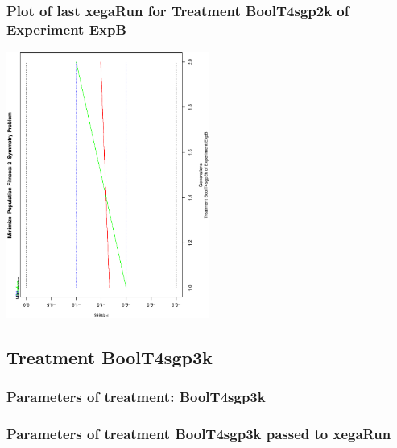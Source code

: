 \documentclass[18pt,c]{beamer}
\makeatletter
\def\beamer@writeslidentry@miniframesoff{%
  \expandafter\beamer@ifempty\expandafter{\beamer@framestartpage}{}%
  {%
   \clearpage\beamer@notesactions%
  }
}
\newcommand*{\miniframesoff}{\let\beamer@writeslidentry=\beamer@writeslidentry@miniframesoff}
\makeatother
\begin{document}
 \begin{frame}
 \frametitle{ Plot of last xegaRun for Treatment BoolT4sgp2k of Experiment ExpB }
 \begin{center}
\includegraphics[width=0.5\textwidth, angle=-90]
{ExpBPlotPopStatsFigure020.eps}
 \end{center}
 \label{report/ExpBPlotPopStatsFigure020.eps}  
 \end{frame}

\miniframesoff
\subsection{Treatment BoolT4sgp3k}

 \begin{frame}
 \fontsize{8pt}{9pt}\selectfont
 \frametitle{  Parameters of treatment: BoolT4sgp3k 
 }

 \label{ExpBtParmTable084.tex}  
 \end{frame}


 \begin{frame}
 \fontsize{8pt}{9pt}\selectfont
 \frametitle{  Parameters of treatment BoolT4sgp3k passed to xegaRun
 }

 \label{ExpBtParmTable085.tex}  
 \end{frame}
\end{document}
